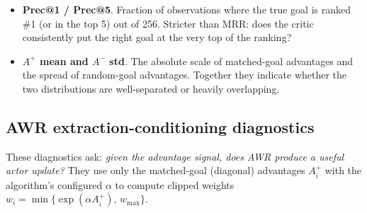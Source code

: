 \documentclass[11pt]{article}
\begin{document}
\begin{itemize}[leftmargin=2em, itemsep=4pt]
  \item \textbf{Prec@1 / Prec@5}.
  Fraction of observations where the true goal is ranked \#1 (or in the top 5) out of 256.
  Stricter than MRR: does the critic consistently put the right goal at the very top of the ranking?

  \item \textbf{$A^+$ mean and $A^-$ std}.
  The absolute scale of matched-goal advantages and the spread of random-goal advantages.
  Together they indicate whether the two distributions are well-separated or heavily overlapping.

\end{itemize}

\subsection{AWR extraction-conditioning diagnostics}

These diagnostics ask: \textit{given the advantage signal, does AWR produce a useful actor update?}
They use only the matched-goal (diagonal) advantages $A_i^+$ with the algorithm's configured $\alpha$
to compute clipped weights $w_i = \min\{\exp(\alpha A_i^+),\, w_{\max}\}$.
\end{document}
